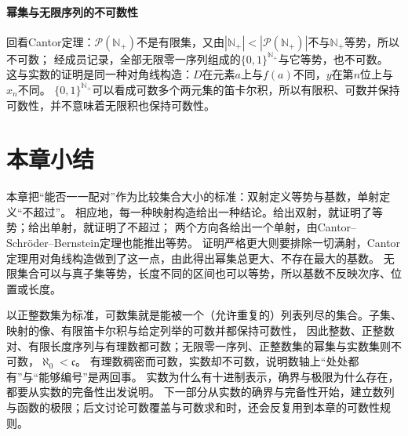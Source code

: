 \paragraph{幂集与无限序列的不可数性}
\label{sec:comb-uncountable-power-set}
回看Cantor定理：$\mathcal P(\mathbb N_+)$不是有限集，又由$|\mathbb N_+|<|\mathcal P(\mathbb N_+)|$不与$\mathbb N_+$等势，所以不可数；
经成员记录，全部无限零一序列组成的$\{0,1\}^{\mathbb N_+}$与它等势，也不可数。
这与实数的证明是同一种对角线构造：$D$在元素$a$上与$f(a)$不同，$y$在第$n$位上与$x_n$不同。
$\{0,1\}^{\mathbb N_+}$可以看成可数多个两元集的笛卡尔积，所以有限积、可数并保持可数性，并不意味着无限积也保持可数性。

\section{本章小结}
\label{sec:cardinality-summary}

本章把“能否一一配对”作为比较集合大小的标准：双射定义等势与基数，单射定义“不超过”。
相应地，每一种映射构造给出一种结论。给出双射，就证明了等势；给出单射，就证明了不超过；
两个方向各给出一个单射，由Cantor--Schröder--Bernstein定理也能推出等势。
证明严格更大则要排除一切满射，Cantor定理用对角线构造做到了这一点，由此得出幂集总更大、不存在最大的基数。
无限集合可以与真子集等势，长度不同的区间也可以等势，所以基数不反映次序、位置或长度。

以正整数集为标准，可数集就是能被一个（允许重复的）列表列尽的集合。子集、映射的像、有限笛卡尔积与给定列举的可数并都保持可数性，
因此整数、正整数对、有限长度序列与有理数都可数；无限零一序列、正整数集的幂集与实数集则不可数，$\aleph_0<\mathfrak c$。
有理数稠密而可数，实数却不可数，说明数轴上“处处都有”与“能够编号”是两回事。
实数为什么有十进制表示，确界与极限为什么存在，都要从实数的完备性出发说明。
下一部分从实数的确界与完备性开始，建立数列与函数的极限；后文讨论可数覆盖与可数求和时，还会反复用到本章的可数性规则。
